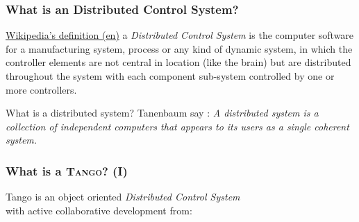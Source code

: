 \documentclass{beamer}
\newcommand{\tango}{\textsc{Tango}}
\begin{document}
\begin{frame}
\frametitle{What is an Distributed Control System?}
    \begin{block}{\href{http://en.wikipedia.org/wiki/Distributed_control_system}{Wikipedia's definition (en)}}
        a \emph{Distributed Control System} is the computer software for a manufacturing system, process or any kind of dynamic system, in which the controller elements are not central in location (like the brain) but are distributed throughout the system with each component sub-system controlled by one or more controllers.
    \end{block}
    \begin{block}{What is a distributed system?}
        Tanenbaum say \cite{TanenbaumDistr}: \emph{A distributed system is a collection of independent computers that appears to its users as a single coherent system.}
    \end{block}
\end{frame}

\begin{frame}
\frametitle{What is a \tango? (I)}
    Tango is an object oriented \emph{Distributed Control System}\\with active collaborative development from:
    \begin{figure}[h]
    \end{figure}
\end{frame}
\end{document}
